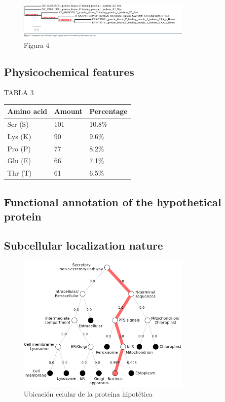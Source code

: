 \documentclass[journal,transmag]{IEEEtran}
\begin{document}
\begin{figure}[!h]
	\center
	\includegraphics[width=8.5cm]{imagenes/arbol3.png}
	\caption{Figura 4}
	\label{4}
\end{figure}

\subsection{\textbf{ Physicochemical features}}

TABLA 3

\begin{table}[htb]
	\begin{tabular}{|l|l|l|}
	\hline
	 Amino acid& Amount  &Percentage  \\ \hline
	 Ser (S) & 101  & 10.8\%  \\ \hline
	 Lys (K) & 90  & 9.6\%  \\ \hline
	 Pro (P) & 77  & 8.2\%  \\ \hline
	 Glu (E) & 66  & 7.1\%  \\ \hline
	 Thr (T) & 61  & 6.5\%  \\ \hline
	\end{tabular}
	\end{table}


\subsection{\textbf{ Functional annotation of the hypothetical protein}}

\subsection{\textbf{ Subcellular localization nature}}

\begin{figure}[!h]
	\center
	\includegraphics[width=8.5cm]{imagenes/localizacion.png}
	\caption{Ubicación celular de la proteína hipotética}
	\label{5}
\end{figure}
\end{document}
